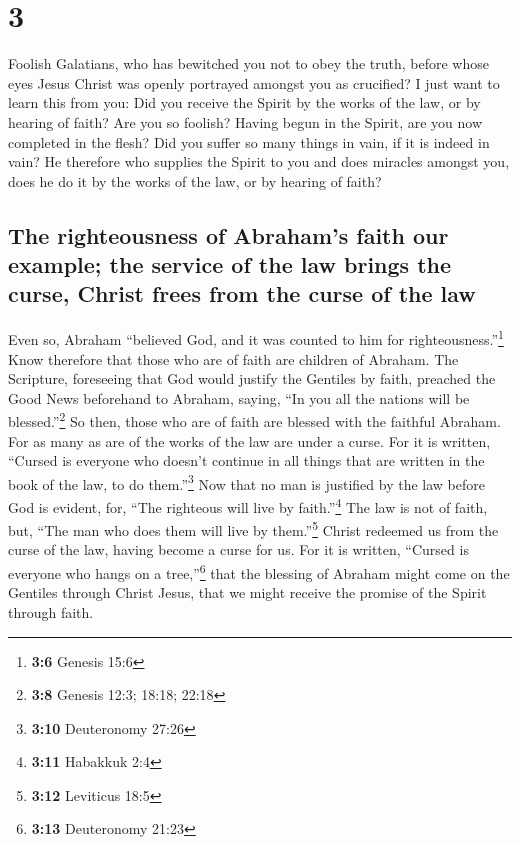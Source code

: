 \hypertarget{section-2}{%
\section{3}\label{section-2}}

 Foolish Galatians, who has bewitched you not to obey the
truth, before whose eyes Jesus Christ was openly portrayed amongst you
as crucified?  I just want to learn this from you: Did you
receive the Spirit by the works of the law, or by hearing of faith?
 Are you so foolish? Having begun in the Spirit, are you
now completed in the flesh?  Did you suffer so many things
in vain, if it is indeed in vain?  He therefore who
supplies the Spirit to you and does miracles amongst you, does he do it
by the works of the law, or by hearing of faith?

\hypertarget{the-righteousness-of-abrahams-faith-our-example-the-service-of-the-law-brings-the-curse-christ-frees-from-the-curse-of-the-law}{%
\subsection{The righteousness of Abraham's faith our example; the
service of the law brings the curse, Christ frees from the curse of the
law}\label{the-righteousness-of-abrahams-faith-our-example-the-service-of-the-law-brings-the-curse-christ-frees-from-the-curse-of-the-law}}

 Even so, Abraham ``believed God, and it was counted to
him for righteousness.''\footnote{\textbf{3:6} Genesis 15:6}
 Know therefore that those who are of faith are children
of Abraham.  The Scripture, foreseeing that God would
justify the Gentiles by faith, preached the Good News beforehand to
Abraham, saying, ``In you all the nations will be blessed.''\footnote{\textbf{3:8}
  Genesis 12:3; 18:18; 22:18}  So then, those who are of
faith are blessed with the faithful Abraham.  For as many
as are of the works of the law are under a curse. For it is written,
``Cursed is everyone who doesn't continue in all things that are written
in the book of the law, to do them.''\footnote{\textbf{3:10} Deuteronomy
  27:26}  Now that no man is justified by the law before
God is evident, for, ``The righteous will live by faith.''\footnote{\textbf{3:11}
  Habakkuk 2:4}  The law is not of faith, but, ``The man
who does them will live by them.''\footnote{\textbf{3:12} Leviticus 18:5}
 Christ redeemed us from the curse of the law, having
become a curse for us. For it is written, ``Cursed is everyone who hangs
on a tree,''\footnote{\textbf{3:13} Deuteronomy 21:23} 
that the blessing of Abraham might come on the Gentiles through Christ
Jesus, that we might receive the promise of the Spirit through faith.


